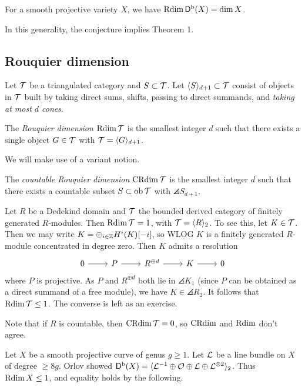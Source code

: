 \documentclass{amsart}
\begin{document}
\begin{conj}[Orlov]
	For a smooth projective variety $X$, we have $\operatorname{Rdim} \mathsf{D}^{\mathrm{b}}(X) = \dim X$.
\end{conj}

In this generality, the conjecture implies Theorem 1.

\subsection{Rouquier dimension}

Let $\mathcal{T}$ be a triangulated category and $S \subset \mathcal{T}$.
Let $\langle {S} \rangle_{d+1} \subset \mathcal{T}$ consist of objects in $\mathcal{T}$ built by taking direct sums, shifts, passing to direct summands, and \emph{taking at most $d$ cones}.

\begin{dfn}
	The \emph{Rouquier dimension} $\operatorname{Rdim} \mathcal{T}$ is the smallest integer $d$ such that there exists a single object $G \in \mathcal{T}$ with $\mathcal{T} = \langle {G} \rangle_{d+1}$.
\end{dfn}

We will make use of a variant notion.

\begin{dfn}
	The \emph{countable Rouquier dimension} $\operatorname{CRdim} \mathcal{T}$ is the smallest integer $d$ such that there exists a countable subset $S \subset \operatorname{ob} \mathcal{T}$ with $\angles{S}_{d+1}$.
\end{dfn}

\begin{ex}
	Let $R$ be a Dedekind domain and $\mathcal{T}$ the bounded derived category of finitely generated $R$-modules.
	Then $\operatorname{Rdim} \mathcal{T} = 1$, with $\mathcal{T} = \langle {R} \rangle_2$.
	To see this, let $K \in \mathcal{T}$.
	Then we may write $K = \oplus_{i \in \mathbb{Z}} H^i(K)[-i]$, so WLOG $K$ is a finitely generated $R$-module concentrated in degree zero.
	Then $K$ admits a resolution
	\[
		\SES{P}{R^{\oplus d}}{K}
	\]
	where $P$ is projective.
	As $P$ and $R^{\oplus d}$ both lie in $\angles{K}_1$ (since $P$ can be obtained as a direct summand of a free module), we have $K \in \angles{R}_2$.
	It follows that $\operatorname{Rdim} \mathcal{T} \leq 1$.
	The converse is left as an exercise.

	Note that if $R$ is countable, then $\operatorname{CRdim} \mathcal{T} = 0$, so $\operatorname{CRdim}$ and $\operatorname{Rdim}$ don't agree.
\end{ex}

\begin{ex}
	Let $X$ be a smooth projective curve of genus $g \geq 1$.
	Let $\mathcal{L}$ be a line bundle on $X$ of degree $\geq 8g$.
	Orlov showed $\mathsf{D}^{\mathrm{b}}(X) = \langle {\mathcal{L}^{-1}\oplus \mathcal{O}\oplus \mathcal{L}\oplus \mathcal{L}^{\otimes 2}} \rangle_2$.
	Thus $\operatorname{Rdim} X \leq 1$, and equality holds by the following.
\end{ex}
\end{document}
